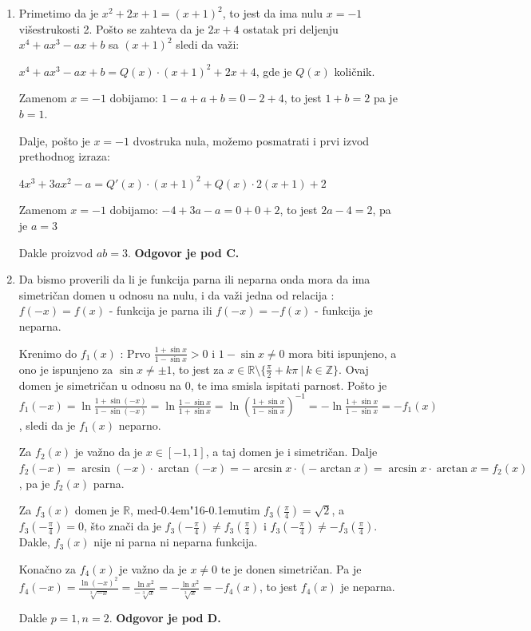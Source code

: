 \documentclass[a4paper,12pt]{report}
\def\dj{d\kern-0.4em\char"16\kern-0.1em}
\begin{document}
\begin{enumerate}[1.]
\item Primetimo da je $x^2 +2x+1 = (x+1)^2$, to jest da ima nulu $x =-1$ vi\v{s}estrukosti 2. Po\v{s}to se zahteva da je $2x+4$ ostatak pri deljenju $x^4 + ax^3 -ax +b $ sa $(x+1)^2$ sledi da va\v{z}i:
\par  $x^4 + ax^3 -ax +b  = Q(x) \cdot (x+1)^2 + 2x+4$, gde je $Q(x)$ koli\v{c}nik.
\par Zamenom $x=-1$ dobijamo: $1-a+a+b = 0 -2 +4 $, to jest $ 1+b = 2$ pa je $b = 1$.
\par Dalje, po\v{s}to je $x=-1$ dvostruka nula, mo\v{z}emo posmatrati i prvi izvod prethodnog izraza:
\par $4x^3 + 3ax^2 -a = Q'(x) \cdot (x+1)^2 + Q(x) \cdot 2(x+1) + 2$
\par Zamenom $x=-1$ dobijamo: $-4 + 3a -a = 0+0+2$, to jest $2a-4 = 2$, pa je $a = 3$
\par Dakle proizvod $ab =3 $. \textbf{Odgovor je pod C.}

\item Da bismo proverili da li je funkcija parna ili neparna onda mora da ima simetri\v{c}an domen u odnosu na nulu, i da va\v{z}i jedna od relacija : $f(-x) = f(x) $ - funkcija je parna ili $f(-x) = -f(x) $ - funkcija je neparna.
\par Krenimo do $f_1(x)$ : Prvo $\frac{1 + \sin{x}}{1 - \sin{x}} > 0$ i $1 - \sin{x} \neq 0$ mora biti ispunjeno, a ono je ispunjeno za $\sin{x} \neq \pm 1$, to jest za $x \in \mathbb{R}\setminus\{\frac{\pi}{2}+k\pi\ |\ k\in\mathbb{Z}\}$. Ovaj domen je simetri\v{c}an u odnosu na 0, te ima smisla ispitati parnost. Po\v{s}to je $f_1(-x) = \ln \frac{1 + \sin(-x)}{1 - \sin(-x)} =\ln \frac{1 - \sin{x}}{1 + \sin{x}} =   \ln \left(\frac{1 + \sin{x}}{1 - \sin{x}}\right)^{-1} =-\ln\frac{1 + \sin{x}}{1 - \sin{x}}=-f_1(x) $, sledi da je $f_1(x)$ neparno.
\par Za $f_2(x)$ je va\v{z}no da je $x \in [-1,1]$, a taj domen je i simetri\v{c}an. Dalje $ f_2(-x) = \arcsin(-x) \cdot \arctan(-x) = -  \arcsin{x} \cdot ( - \arctan{x} ) =  \arcsin{x} \cdot \arctan{x}  = f_2(x)$, pa je $f_2(x)$ parna.
\par Za $f_3(x) $ domen je $\mathbb{R}$, me\dj{}utim $f_3 \left(\frac{\pi}{4}\right) = \sqrt{2}$, a $f_3 \left(- \frac{\pi}{4}\right) = 0$, \v{s}to zna\v{c}i da je $f_3 \left(-\frac{\pi}{4}\right) \neq f_3 \left(\frac{\pi}{4}\right)$ i $f_3 \left(-\frac{\pi}{4}\right)\neq-f_3 \left(\frac{\pi}{4}\right)$. Dakle, $f_3(x)$ nije ni parna ni neparna funkcija.
\par Kona\v{c}no za $f_4(x)$ je va\v{z}no da je $x\neq 0$ te je donen simetri\v{c}an. Pa je $f_4(-x) = \frac{\ln{(-x)^2}}{\sqrt[3]{-x}} = \frac{\ln{x^2}}{-\sqrt[3]{x}} = - \frac{\ln{x^2}}{\sqrt[3]{x}} = - f_4(x)$, to jest $f_4(x)$ je neparna. 
\par Dakle $p = 1,n=2$.  \textbf{Odgovor je pod D.}


\end{enumerate}
\end{document}
